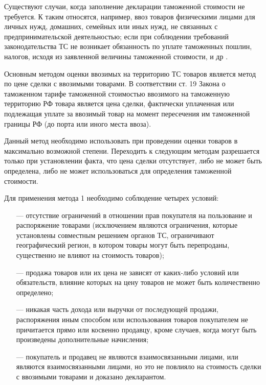 Существуют случаи, когда заполнение декларации таможенной стоимости не требуется. К таким относятся, например, ввоз товаров физическими лицами для личных нужд, домашних, семейных или иных нужд, не связанных с предпринимательской деятельностью; если при соблюдении требований законодательства ТС не возникает обязанность по уплате таможенных пошлин, налогов, исходя из заявленной величины таможенной стоимости, и др \cite[с. 126--127]{novikova}.

Основным методом оценки ввозимых на территорию ТС товаров является метод по цене сделки с ввозимыми товарами. В соответствии ст. 19 Закона о таможенном тарифе таможенной стоимостью ввозимого на таможенную территорию РФ товара является цена сделки, фактически уплаченная или подлежащая уплате за ввозимый товар на момент пересечения им таможенной границы РФ (до порта или иного места ввоза).

Данный метод необходимо использовать при проведении оценки товаров в максимально возможной степени. Переходить к следующим методам разрешается только при установлении факта, что цена сделки отсутствует, либо не может быть определена, либо не может использоваться для определения таможенной стоимости.

Для применения метода 1 необходимо соблюдение четырех условий:
\begin{enumerate}
	\item [---] отсутствие ограничений в отношении прав покупателя на пользование и распоряжение товарами (исключением являются ограничения, которые установлены совместным решением органов ТС, ограничивают географический регион, в котором товары могут быть перепроданы, существенно не влияют на стоимость товаров);
	\item [---] продажа товаров или их цена не зависят от каких-либо условий или обязательств, влияние которых на цену товаров не может быть количественно определено;
	\item [---] никакая часть дохода или выручки от последующей продажи, распоряжения иным способом или использования товаров покупателем не причитается прямо или косвенно продавцу, кроме случаев, когда могут быть произведены дополнительные начисления;
	\item [---] покупатель и продавец не являются взаимосвязанными лицами, или являются взаимосвязанными лицами, но это не повлияло на стоимость сделки с ввозимыми товарами и доказано декларантом.
\end{enumerate}

